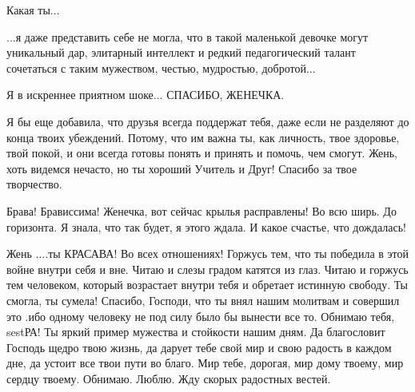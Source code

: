 \begin{itemize}
	

Какая ты...

...я даже представить себе не могла, что в такой маленькой девочке могут
уникальный дар, элитарный интеллект и редкий педагогический талант сочетаться
с таким мужеством, честью, мудростью, добротой...

Я в искреннее приятном шоке... СПАСИБО, ЖЕНЕЧКА.


Я бы еще добавила, что друзья всегда поддержат тебя, даже если не разделяют до
конца твоих убеждений. Потому, что им важна ты, как личность,
твое здоровье, твой покой, и они всегда готовы понять и принять
и помочь, чем смогут. Жень, хоть видемся нечасто, но ты хороший
Учитель и Друг! Спасибо за твое творчество.


Брава! Брависсима! Женечка, вот сейчас крылья расправлены! Во всю ширь. До
горизонта. Я знала, что так будет, я этого ждала. И какое
счастье, что дождалась!


Жень ....ты КРАСАВА! Во всех отношениях! Горжусь тем, что ты победила в этой
войне внутри себя и вне. Читаю и слезы градом катятся из глаз. Читаю и горжусь
тем человеком, который возрастает внутри тебя и обретает истинную свободу. Ты
смогла, ты сумела! Спасибо, Господи, что ты внял нашим молитвам и совершил это
.ибо одному человеку не под силу было бы вынести все то. Обнимаю тебя, sestРА!
Ты яркий пример мужества и стойкости нашим дням. Да благословит Господь щедро
твою жизнь, да дарует тебе свой мир и свою радость в каждом дне, да устоит все
твои пути во благо. Мир тебе, дорогая, мир дому твоему, мир сердцу твоему.
Обнимаю. Люблю. Жду скорых радостных вестей.

\end{itemize}
